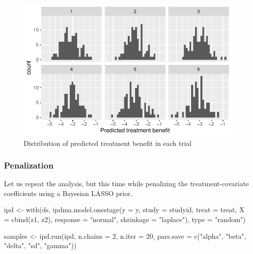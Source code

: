 \documentclass[
  letterpaper,
  DIV=11,
  numbers=noendperiod]{scrreprt}
\newenvironment{Shaded}{\begin{snugshade}}{\end{snugshade}}
\newcommand{\AttributeTok}[1]{\textcolor[rgb]{0.40,0.45,0.13}{#1}}
\newcommand{\DecValTok}[1]{\textcolor[rgb]{0.68,0.00,0.00}{#1}}
\newcommand{\FunctionTok}[1]{\textcolor[rgb]{0.28,0.35,0.67}{#1}}
\newcommand{\NormalTok}[1]{\textcolor[rgb]{0.00,0.23,0.31}{#1}}
\newcommand{\OtherTok}[1]{\textcolor[rgb]{0.00,0.23,0.31}{#1}}
\newcommand{\StringTok}[1]{\textcolor[rgb]{0.13,0.47,0.30}{#1}}
\begin{document}
\begin{figure}[H]

{\centering \includegraphics{chapter_16_files/figure-pdf/fig-predben_continuous_outcome-1.pdf}

}

\caption{\label{fig-predben_continuous_outcome}Distribution of predicted
treatment benefit in each trial}

\end{figure}

\hypertarget{penalization}{%
\subsubsection{Penalization}\label{penalization}}

Let us repeat the analysis, but this time while penalizing the
treatment-covariate coefficients using a Bayesian LASSO prior.

\begin{Shaded}
\begin{Highlighting}[]
\NormalTok{ipd }\OtherTok{\textless{}{-}} \FunctionTok{with}\NormalTok{(ds, }\FunctionTok{ipdma.model.onestage}\NormalTok{(}\AttributeTok{y =}\NormalTok{ y, }\AttributeTok{study =}\NormalTok{ studyid, }
                                     \AttributeTok{treat =}\NormalTok{ treat,}
                                     \AttributeTok{X =} \FunctionTok{cbind}\NormalTok{(z1, z2), }
                                     \AttributeTok{response =} \StringTok{"normal"}\NormalTok{, }
                                     \AttributeTok{shrinkage =} \StringTok{"laplace"}\NormalTok{), }
            \AttributeTok{type =} \StringTok{"random"}\NormalTok{)}

\NormalTok{samples }\OtherTok{\textless{}{-}} \FunctionTok{ipd.run}\NormalTok{(ipd, }\AttributeTok{n.chains =} \DecValTok{2}\NormalTok{, }\AttributeTok{n.iter =} \DecValTok{20}\NormalTok{, }
                   \AttributeTok{pars.save =} \FunctionTok{c}\NormalTok{(}\StringTok{"alpha"}\NormalTok{, }\StringTok{"beta"}\NormalTok{, }\StringTok{"delta"}\NormalTok{, }\StringTok{"sd"}\NormalTok{, }\StringTok{"gamma"}\NormalTok{))}
\end{Highlighting}
\end{Shaded}
\end{document}
